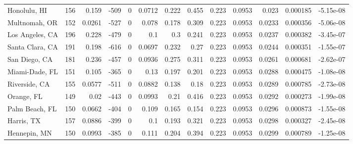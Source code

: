 \documentclass[12pt,letterpaper]{article}
\begin{document}
{\begin{appendices}
\begin{sidewaystable}
{\begin{tabular}{lrrrrrrrrrrrr}
 Honolulu, HI       & 156   & 0.159   & -509   &     0 &          0.0712 &           0.222  &         0.455  &              0.223 &             0.0953 &           0.023   &        0.000185 &       -5.15e-08  \\
 Multnomah, OR      & 152   & 0.0261  & -527   &     0 &          0.078  &           0.178  &         0.309  &              0.223 &             0.0953 &           0.0233  &        0.000356 &       -5.06e-08  \\
 Los Angeles, CA    & 196   & 0.228   & -479   &     0 &          0.1    &           0.3    &         0.241  &              0.223 &             0.0953 &           0.0237  &        0.000382 &       -3.45e-07  \\
 Santa Clara, CA    & 191   & 0.198   & -616   &     0 &          0.0697 &           0.232  &         0.27   &              0.223 &             0.0953 &           0.0244  &        0.000351 &       -1.55e-07  \\
 San Diego, CA      & 181   & 0.236   & -457   &     0 &          0.0936 &           0.275  &         0.311  &              0.223 &             0.0953 &           0.0261  &        0.000681 &       -2.62e-07  \\
 Miami-Dade, FL     & 151   & 0.105   & -365   &     0 &          0.13   &           0.197  &         0.201  &              0.223 &             0.0953 &           0.0288  &        0.000475 &       -1.08e-08  \\
 Riverside, CA      & 155   & 0.0577  & -511   &     0 &          0.0882 &           0.138  &         0.18   &              0.223 &             0.0953 &           0.0289  &        0.000785 &       -2.73e-08  \\
 Orange, FL         & 149   & 0.02    & -443   &     0 &          0.0993 &           0.21   &         0.416  &              0.223 &             0.0953 &           0.0292  &        0.000273 &       -1.99e-08  \\
 Palm Beach, FL     & 150   & 0.0662  & -404   &     0 &          0.109  &           0.165  &         0.154  &              0.223 &             0.0953 &           0.0296  &        0.000873 &       -1.55e-08  \\
 Harris, TX         & 157   & 0.0886  & -399   &     0 &          0.1    &           0.193  &         0.321  &              0.223 &             0.0953 &           0.0298  &        0.000327 &       -2.45e-08  \\
 Hennepin, MN       & 150   & 0.0993  & -385   &     0 &          0.111  &           0.204  &         0.394  &              0.223 &             0.0953 &           0.0299  &        0.000789 &       -1.25e-08  \\

\end{tabular}}
\end{sidewaystable}
\end{appendices}}
\end{document}
